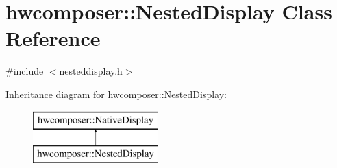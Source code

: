 \hypertarget{classhwcomposer_1_1NestedDisplay}{}\section{hwcomposer\+:\+:Nested\+Display Class Reference}
\label{classhwcomposer_1_1NestedDisplay}


{\ttfamily \#include $<$nesteddisplay.\+h$>$}

Inheritance diagram for hwcomposer\+:\+:Nested\+Display\+:\begin{figure}[H]
\begin{center}
\leavevmode
\includegraphics[height=2.000000cm]{classhwcomposer_1_1NestedDisplay}
\end{center}
\end{figure}
